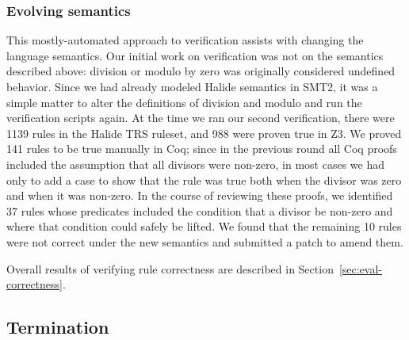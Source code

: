 \documentclass[acmsmall,review,anonymous]{acmart}\settopmatter{printfolios=true,printccs=false,printacmref=false}
\newcommand{\NumZdivRules}{{\color{black} 1139}\xspace}
\newcommand{\NumZdivZThreeProvedRules}{{\color{black} 988}\xspace}
\newcommand{\NumZdivCoqProvedRules}{{\color{black} 141}\xspace}
\newcommand{\NumZdivFalseRules}{{\color{black} 10}\xspace}
\newcommand{\NumZdivRelaxedPredicates}{{\color{black} 37}\xspace}
\begin{document}
%

\subsubsection{Evolving semantics}
\label{sub:evolvingsemantics}

This mostly-automated approach to verification assists with changing
the language semantics. Our initial work on verification was not on
the semantics described above: division or modulo by zero was originally
considered undefined behavior. Since we had already
modeled Halide semantics in SMT2, it was a simple matter to alter the
definitions of division and modulo and run the verification scripts
again. At the time we ran our second verification, there were
\NumZdivRules rules in the Halide TRS ruleset, and \NumZdivZThreeProvedRules
were proven true in Z3. We proved \NumZdivCoqProvedRules rules to be
true manually in Coq; since in the previous round all Coq proofs
included the assumption that all divisors were non-zero, in most cases
we had only to add a case to show that the rule was true both when the
divisor was zero and when it was non-zero. In the course of reviewing
these proofs, we identified \NumZdivRelaxedPredicates rules whose
predicates included the condition that a divisor be non-zero and where
that condition could safely be lifted. We found that the remaining
\NumZdivFalseRules rules were not correct under the new semantics and
submitted a patch to amend them.

Overall results of verifying rule correctness are described in Section~\ref{sec:eval-correctness}.

\subsection{Termination}
\label{sub:termination}
\end{document}
